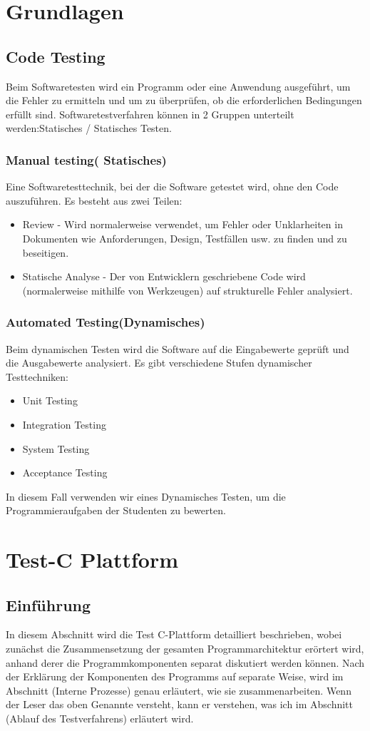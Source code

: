 \documentclass[a4paper,12pt,oneside]{book}
\begin{document}
\chapter{Grundlagen}
\section{Code Testing}
Beim Softwaretesten wird ein Programm oder eine Anwendung ausgeführt, um die Fehler zu ermitteln und um zu überprüfen, ob die erforderlichen Bedingungen erfüllt sind.
\newline
Softwaretestverfahren können in 2 Gruppen unterteilt werden:Statisches / Statisches Testen.
\subsection{Manual testing( Statisches)}
Eine Softwaretesttechnik, bei der die Software getestet wird, ohne den Code auszuführen. Es besteht aus zwei Teilen:
\begin{itemize}
	\item Review - Wird normalerweise verwendet, um Fehler oder Unklarheiten in Dokumenten wie Anforderungen, Design, Testfällen usw. zu finden und zu beseitigen.
	\item Statische Analyse - Der von Entwicklern geschriebene Code wird (normalerweise mithilfe von Werkzeugen) auf strukturelle Fehler analysiert. 
\end{itemize}
\subsection{Automated Testing(Dynamisches)}
Beim dynamischen Testen wird die Software auf die Eingabewerte geprüft und die Ausgabewerte analysiert. Es gibt verschiedene Stufen dynamischer Testtechniken: 
\begin{itemize}
	\item Unit Testing
	\item Integration Testing
	\item System Testing
	\item Acceptance Testing
\end{itemize}
In diesem Fall verwenden wir eines Dynamisches Testen, um die Programmieraufgaben der Studenten zu bewerten.

\chapter{Test-C Plattform}
\section{Einführung}
In diesem Abschnitt wird die Test C-Plattform detailliert beschrieben, wobei zunächst die Zusammensetzung der gesamten Programmarchitektur erörtert wird, anhand derer die Programmkomponenten separat diskutiert werden können. Nach der Erklärung der Komponenten des Programms auf separate Weise, wird im Abschnitt (Interne Prozesse) genau erläutert, wie sie zusammenarbeiten.
\newline
Wenn der Leser das oben Genannte versteht, kann er verstehen, was ich im Abschnitt  (Ablauf des Testverfahrens) erläutert wird.
\end{document}
